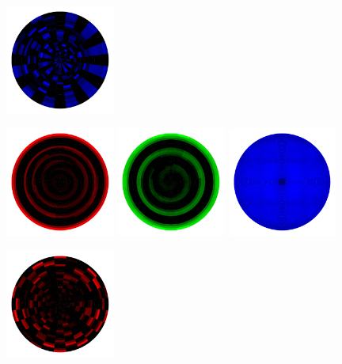 \begin{figure}[h!]
\begin{center}
        \includegraphics[width=0.32\textwidth]{figures/appendix_featurevis/spread_45.pdf}
    \end{center}
    \begin{center}
        \includegraphics[width=0.32\textwidth]{figures/appendix_featurevis/spread_1.pdf}
        \includegraphics[width=0.32\textwidth]{figures/appendix_featurevis/spread_31.pdf}
        \includegraphics[width=0.32\textwidth]{figures/appendix_featurevis/spread_46.pdf}
    \end{center}
    \begin{center}
        \includegraphics[width=0.32\textwidth]{figures/appendix_featurevis/spread_5.pdf}

\end{center}
\end{figure}
